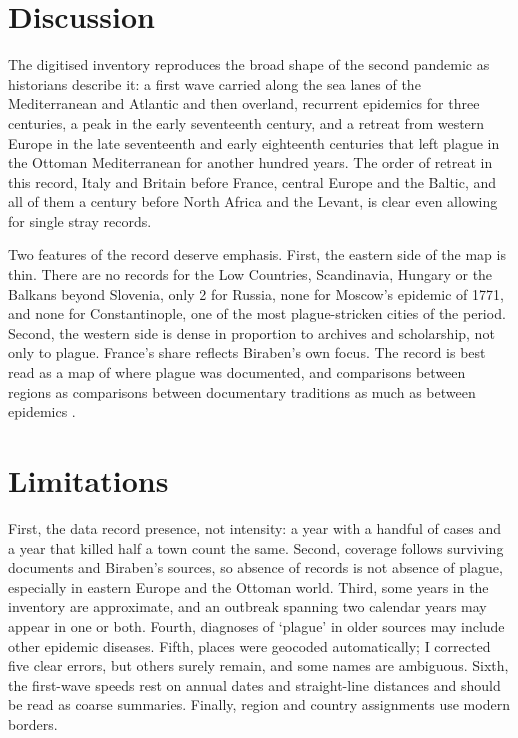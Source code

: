 \documentclass[11pt,a4paper]{article}
\begin{document}
\section{Discussion}
The digitised inventory reproduces the broad shape of the second pandemic as historians describe it: a first wave carried along the sea lanes of the Mediterranean and Atlantic and then overland, recurrent epidemics for three centuries, a peak in the early seventeenth century, and a retreat from western Europe in the late seventeenth and early eighteenth centuries that left plague in the Ottoman Mediterranean for another hundred years. The order of retreat in this record, Italy and Britain before France, central Europe and the Baltic, and all of them a century before North Africa and the Levant, is clear even allowing for single stray records.

Two features of the record deserve emphasis. First, the eastern side of the map is thin. There are no records for the Low Countries, Scandinavia, Hungary or the Balkans beyond Slovenia, only 2 for Russia, none for Moscow's epidemic of 1771, and none for Constantinople, one of the most plague-stricken cities of the period. Second, the western side is dense in proportion to archives and scholarship, not only to plague. France's share reflects Biraben's own focus. The record is best read as a map of where plague was documented, and comparisons between regions as comparisons between documentary traditions as much as between epidemics \citep{roosen2018}.

\section{Limitations}
First, the data record presence, not intensity: a year with a handful of cases and a year that killed half a town count the same. Second, coverage follows surviving documents and Biraben's sources, so absence of records is not absence of plague, especially in eastern Europe and the Ottoman world. Third, some years in the inventory are approximate, and an outbreak spanning two calendar years may appear in one or both. Fourth, diagnoses of `plague' in older sources may include other epidemic diseases. Fifth, places were geocoded automatically; I corrected five clear errors, but others surely remain, and some names are ambiguous. Sixth, the first-wave speeds rest on annual dates and straight-line distances and should be read as coarse summaries. Finally, region and country assignments use modern borders.
\end{document}

